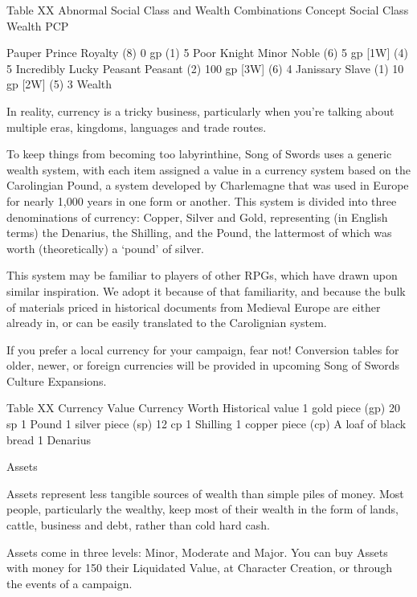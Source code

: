 \documentclass[oneside,11pt,english]{book}
\begin{document}
 
Table XX Abnormal Social Class and Wealth Combinations 
Concept Social Class Wealth PCP 


Pauper Prince Royalty (8) 0 gp (1) 5 
Poor Knight Minor Noble (6) 5 gp [1W] (4) 5 
Incredibly Lucky Peasant Peasant (2) 100 gp [3W] (6) 4 
Janissary Slave (1) 10 gp [2W] (5) 3 
Wealth 

 

In reality, currency is a tricky business, particularly when you're talking about multiple eras, kingdoms, 
languages and trade routes. 

 

To keep things from becoming too labyrinthine, Song of Swords uses a generic wealth system, with each 
item assigned a value in a currency system based on the Carolingian Pound, a system developed by 
Charlemagne that was used in Europe for nearly 1,000 years in one form or another. This system is 
divided into three denominations of currency: Copper, Silver and Gold, representing (in English terms) 
the Denarius, the Shilling, and the Pound, the lattermost of which was worth (theoretically) a ‘pound’ of 
silver. 

 

This system may be familiar to players of other RPGs, which have drawn upon similar inspiration. We 
adopt it because of that familiarity, and because the bulk of materials priced in historical documents from 
Medieval Europe are either already in, or can be easily translated to the Carolignian system. 

 

If you prefer a local currency for your campaign, fear not! Conversion tables for older, newer, or foreign 
currencies will be provided in upcoming Song of Swords Culture Expansions. 

 
Table XX Currency Value 
Currency Worth Historical value 
1 gold piece (gp) 20 sp 1 Pound 
1 silver piece (sp) 12 cp 1 Shilling 
1 copper piece (cp) A loaf of black bread 1 Denarius 

 

Assets 

 
Assets represent less tangible sources of wealth than simple piles of money. Most people, particularly the 
wealthy, keep most of their wealth in the form of lands, cattle, business and debt, rather than cold hard 
cash. 

 


Assets come in three levels: Minor, Moderate and Major. You can buy Assets with money for 150%
their Liquidated Value, at Character Creation, or through the events of a campaign. 
\end{document}
